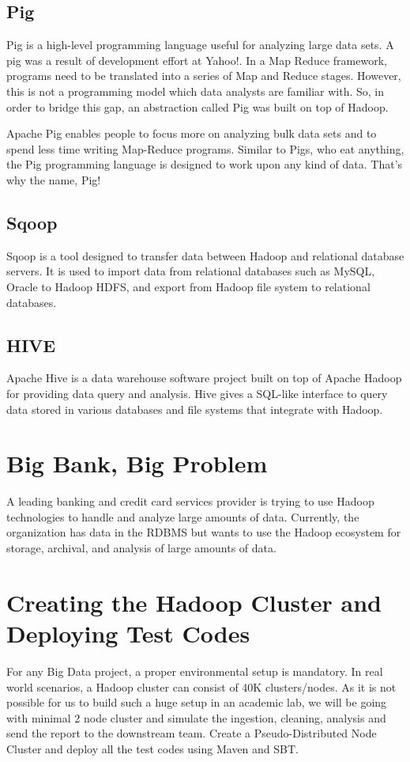 \subsection{Pig }
Pig is a high-level programming language useful for analyzing large data sets. A pig was a result of development effort at Yahoo!.
In a Map Reduce framework, programs need to be translated into a series of Map and Reduce stages. However, this is not a programming model which data analysts are familiar with. So, in order to bridge this gap, an abstraction called Pig was built on top of Hadoop.

Apache Pig enables people to focus more on analyzing bulk data sets and to spend less time writing Map-Reduce programs. Similar to Pigs, who eat anything, the Pig programming language is designed to work upon any kind of data. That's why the name, Pig! 

\subsection{Sqoop }
Sqoop is a tool designed to transfer data between Hadoop and relational database servers. It is used to import data from relational databases such as MySQL, Oracle to Hadoop HDFS, and export from Hadoop file system to relational databases.
\subsection{HIVE}
Apache Hive is a data warehouse software project built on top of Apache Hadoop for providing data query and analysis. Hive gives a SQL-like interface to query data stored in various databases and file systems that integrate with Hadoop.
\section{Big Bank, Big Problem}
A leading banking and credit card services provider is trying to use Hadoop
technologies to handle and analyze large amounts of data.\newline
Currently, the organization has data in the RDBMS but wants to use the
Hadoop ecosystem for storage, archival, and analysis of large amounts of
data.
\section{Creating the Hadoop Cluster and Deploying Test Codes}
For any Big Data project, a proper environmental setup is mandatory. In
real world scenarios, a Hadoop cluster can consist of 40K clusters/nodes.
As it is not possible for us to build such a huge setup in an academic lab,
we will be going with minimal 2 node cluster and simulate the ingestion,
cleaning, analysis and send the report to the downstream team.
Create a Pseudo-Distributed Node Cluster and deploy all the test codes
using Maven and SBT.\newpage
